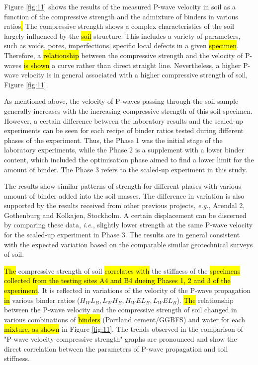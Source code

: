 \documentclass{amestyle}
\begin{document}
Figure \ref{fig:11} shows the results of the measured P-wave velocity in soil\hl{ }as a function of the compressive strength and the admixture of binders in various ratios\hl{. }The compressive strength shows a complex characteristics of the soil largely influenced by the \hl{soil} structure. This includes a variety of parameters, such as voids, pores, imperfections,\hl{ }specific local defects in a given \hl{specimen}. Therefore, a \hl{relationship} between the compressive strength and the velocity of P-waves \hl{is shown} a curve rather than direct straight line. Nevertheless, a higher P-wave velocity is in general associated with a higher compressive strength of soil, \hl{ }Figure \ref{fig:11}. 

As mentioned above, the velocity of P-waves passing through the soil sample generally increases with the increasing compressive strength of this soil specimen. However, a certain difference between the laboratory results and the scaled-up experiments can be seen for each recipe of binder ratios tested during different phases of the experiment. Thus, the Phase 1 was the initial stage of the laboratory experiments, while the Phase 2 is a supplement with a lower binder content, which included the optimisation phase aimed to find a lower limit for the amount of binder. The Phase 3 refers to the scaled-up experiment in this study. 

The results show similar patterns of strength for different phases with various amount of binder added into the soil masses. The difference in variation is also supported by the results received from other previous projects, \emph{e.g.}, Arendal 2, Gothenburg and Kolkajen, Stockholm. A certain displacement can be discerned by comparing these data, \emph{i.e.}, slightly lower strength at the same P-wave velocity for the scaled-up experiment in Phase 3. The results are in general consistent with the expected variation based on the comparable similar geotechnical surveys of soil. 

\hl{The} compressive strength of soil\hl{ correlates with} the stiffness of the \hl{specimens collected from the testing sites A4 and B4 dueing Phases 1, 2 and 3 of the experiment}. It is \hl{ }reflected in variations of the velocity of the P-wave propagation \hl{in} various binder ratios ($H_WL_B, L_WH_B, H_WEL_B, L_WEL_B$). \hl{The} relationship between the P-wave velocity and the compressive strength of soil\hl{ }changed in various combinations of \hl{binders} (Portland cement/GGBFS) and water\hl{ }for each \hl{mixture, as shown} in Figure \ref{fig:11}. The trends observed in the comparison of "P-wave velocity-compressive strength" graphs are pronounced and show the direct correlation between the parameters of P-wave propagation and soil stiffness. 
\end{document}
